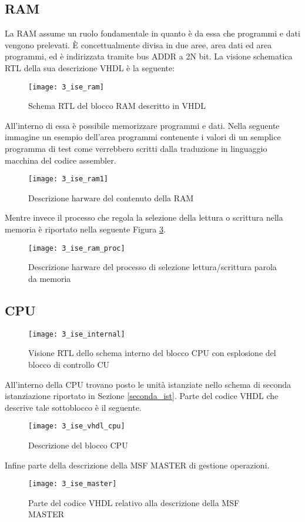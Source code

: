 \subsection{RAM}
La RAM assume un ruolo fondamentale in quanto è da essa che programmi e dati vengono prelevati. È concettualmente divisa in due aree, area dati ed area programmi, ed è indirizzata tramite bus ADDR a 2N bit.
La visione schematica RTL della sua descrizione VHDL è la seguente:
\begin{figure}[H]
	\centering
	\texttt{[image: 3\_ise\_ram]}
	\caption{Schema RTL del blocco RAM descritto in VHDL}
	\label{fig:ise_ram}
\end{figure}
\noindent
All'interno di essa è possibile memorizzare programmi e dati. Nella seguente immagine un esempio dell'area programmi contenente i valori di un semplice programma di test come verrebbero scritti dalla traduzione in linguaggio macchina del codice assembler.
\begin{figure}[H]
	\centering
	\texttt{[image: 3\_ise\_ram1]}
	\caption{Descrizione harware del contenuto della RAM}
	\label{fig:ise_ram_code}
\end{figure}
\noindent
Mentre invece il processo che regola la selezione della lettura o scrittura nella memoria è riportato nella seguente Figura \ref{fig:ise_ram_process}.
\begin{figure}[H]
	\centering
	\texttt{[image: 3\_ise\_ram\_proc]}
	\caption{Descrizione harware del processo di selezione lettura/scrittura parola da memoria}
	\label{fig:ise_ram_process}
\end{figure}

\subsection{CPU}
\begin{figure}[H]
	\centering
	\texttt{[image: 3\_ise\_internal]}
	\caption{Visione RTL dello schema interno del blocco CPU con esplosione del blocco di controllo CU}
	\label{fig:ise_internal}
\end{figure}
\noindent
All'interno della CPU trovano posto le unità istanziate nello schema di seconda istanziazione riportato in Sezione \ref{seconda_ist}. Parte del codice VHDL che descrive tale sottoblocco è il seguente.
\begin{figure}[H]
	\centering
	\texttt{[image: 3\_ise\_vhdl\_cpu]}
	\caption{Descrizione del blocco CPU}
	\label{fig:ise_vhdl_cpu}
\end{figure}
\noindent
Infine parte della descrizione della MSF MASTER di gestione operazioni.
\begin{figure}[H]
	\centering
	\texttt{[image: 3\_ise\_master]}
	\caption{Parte del codice VHDL relativo alla descrizione della MSF MASTER}
	\label{fig:ise_master_msf}
\end{figure}

